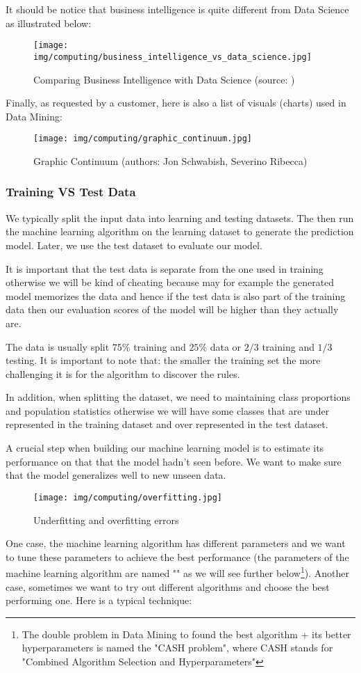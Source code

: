 	It should be notice that business intelligence is quite different from Data Science as illustrated below:
	\begin{figure}[H]
		\centering
		\texttt{[image: img/computing/business\_intelligence\_vs\_data\_science.jpg]}
		\caption[Comparing Business Intelligence with Data Science]{Comparing Business Intelligence with Data Science (source: \cite{emc2015data})}
	\end{figure}
	Finally, as requested by a customer, here is also a list of visuals (charts) used in Data Mining:
	\begin{figure}[H]
		\centering
		\texttt{[image: img/computing/graphic\_continuum.jpg]}
		\caption[Graphic Contiuum]{Graphic Continuum (authors: Jon Schwabish, Severino Ribecca)}
	\end{figure}
	
	\subsubsection{Training VS Test Data}
	We typically split the input data into learning and testing datasets. The then run the machine learning algorithm on the learning dataset to generate the prediction model. Later, we use the test dataset to evaluate our model.

	It is important that the test data is separate from the one used in training otherwise we will be kind of cheating because may for example the generated model memorizes the data and hence if the test data is also part of the training data then our evaluation scores of the model will be higher than they actually are.
	
	The data is usually split $75\%$ training and $25\%$ data or $2/3$ training and $1/3$ testing. It is important to note that: the smaller the training set the more challenging it is for the algorithm to discover the rules.
	
	In addition, when splitting the dataset, we need to maintaining class proportions and population statistics otherwise we will have some classes that are under represented in the training dataset and over represented in the test dataset.
	
	A crucial step when building our machine learning model is to estimate its performance on that that the model hadn't seen before. We want to make sure that the model generalizes well to new unseen data.
	\begin{figure}[H]
		\centering
		\texttt{[image: img/computing/overfitting.jpg]}
		\caption{Underfitting and overfitting errors}
	\end{figure}
	One case, the machine learning algorithm has different parameters and we want to tune these parameters to achieve the best performance (the parameters of the machine learning algorithm are named "" as we will see further below\footnote{The double problem in Data Mining to found the best algorithm + its better hyperparameters is named the "CASH problem", where CASH stands for "Combined Algorithm Selection and Hyperparameters"}). Another case, sometimes we want to try out different algorithms and choose the best performing one. Here is a typical technique:
	
